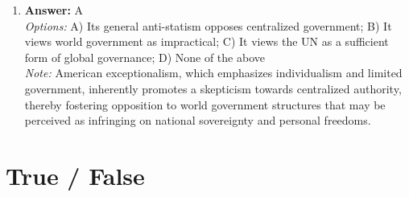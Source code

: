 \documentclass[12pt]{article}
\begin{document}
\begin{enumerate}[label=\arabic*.]
\item \textbf{Answer:} A
\\ \textit{Options:} A) Its general anti-statism opposes centralized government; B) It views world government as impractical; C) It views the UN as a sufficient form of global governance; D) None of the above
\\ \textit{Note:} American exceptionalism, which emphasizes individualism and limited government, inherently promotes a skepticism towards centralized authority, thereby fostering opposition to world government structures that may be perceived as infringing on national sovereignty and personal freedoms.
\end{enumerate}

\section*{True / False}
\end{document}
